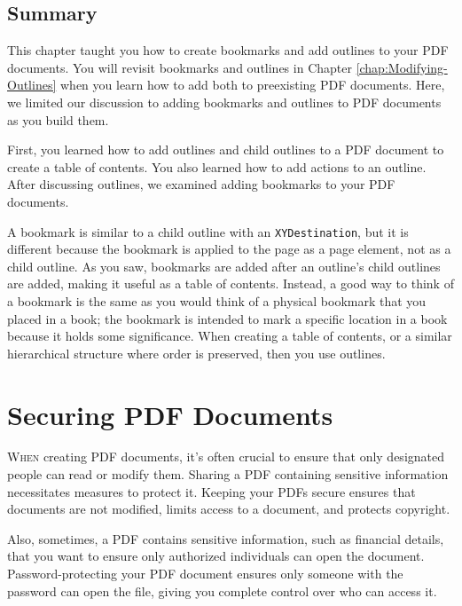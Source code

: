 \documentclass[american,letterpaper]{tufte-book}
\numberwithin{equation}{section}
\numberwithin{figure}{section}
\def\color#1{}%
\begin{document}
{\section{Summary}

This chapter taught you how to create bookmarks and add outlines to
your PDF documents. You will revisit bookmarks and outlines in Chapter \ref{chap:Modifying-Outlines}
when you learn how to add both to preexisting PDF documents. Here, we limited
our discussion to adding bookmarks and outlines to PDF documents as
you build them. 

First, you learned how to add outlines and child outlines
to a PDF document to create a table of contents. You also learned
how to add actions to an outline. After discussing outlines, we examined adding bookmarks to your PDF
documents. 

A bookmark is similar to a child outline with an \texttt{XYDestination},
but it is different because the bookmark is applied to the page as
a page element, not as a child outline. As you saw, bookmarks are
added after an outline's child outlines are added, making it useful
as a table of contents. Instead, a good way to think of a bookmark
is the same as you would think of a physical bookmark that you placed
in a book; the bookmark is intended to mark a specific location in
a book because it holds some significance. When creating a table of
contents, or a similar hierarchical structure where order is preserved,
then you use outlines.

\color{white}
\chapter{Securing PDF Documents}\label{chap:Security,-Signing-and}
\color{black}
\BgThispage
\vspace{8.0em}
\lettrine[lines=2,lhang=0.1]{W}{hen} creating PDF documents, it's often crucial to ensure that only
designated people can read or modify them. Sharing a PDF containing
sensitive information necessitates measures to protect it. Keeping
your PDFs secure ensures that documents are not modified, limits access
to a document, and protects copyright. 

Also, sometimes, a PDF contains sensitive information, such as financial
details, that you want to ensure only authorized individuals can open
the document. Password-protecting your PDF document ensures only someone
with the password can open the file, giving you complete control over
who can access it. 

}
\end{document}
